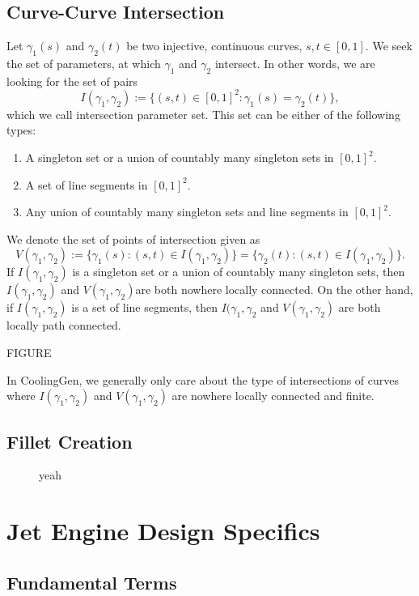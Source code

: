 \documentclass[a4paper, 11pt]{report}
\theoremstyle{definition}
\begin{document}
\subsection{Curve-Curve Intersection}
	Let $\gamma_1(s)$ and $\gamma_2(t)$ be two injective, continuous curves, $s,t \in [0,1]$. We seek the set of parameters, at which $\gamma_1$ and $\gamma_2$ intersect. In other words, we are looking for the set of pairs
		$$ I(\gamma_1, \gamma_2) := \{(s,t) \in [0,1]^2 : \gamma_1(s) = \gamma_2(t)\}, $$
	which we call intersection parameter set. This set can be either of the following types:
	\begin{enumerate}
		\item A singleton set or a union of countably many singleton sets in $[0,1]^2$.
		\item A set of line segments in $[0,1]^2$.
		\item Any union of countably many singleton sets and line segments in $[0,1]^2$.
	\end{enumerate}
	We denote the set of points of intersection given as
		$$ V(\gamma_1, \gamma_2) := \{\gamma_1(s): (s, t) \in I(\gamma_1, \gamma_2)\} = \{\gamma_2(t): (s, t) \in I(\gamma_1, \gamma_2)\}.$$
	If $I(\gamma_1, \gamma_2)$ is a singleton set or a union of countably many singleton sets, then $I(\gamma_1, \gamma_2)$ and $V(\gamma_1, \gamma_2)$are both nowhere locally connected. On the other hand, if $I(\gamma_1, \gamma_2)$ is a set of line segments, then $I(\gamma_1, \gamma_2$ and $V(\gamma_1, \gamma_2)$ are both locally path connected.

	FIGURE

	In CoolingGen, we generally only care about the type of intersections of curves where $I(\gamma_1, \gamma_2)$ and $V(\gamma_1, \gamma_2)$ are nowhere locally connected and finite.

\subsection{Fillet Creation}
\begin{figure}[H]
	\centering
	
	\caption{yeah}
\end{figure}


\section{Jet Engine Design Specifics}
\subsection{Fundamental Terms}
\end{document}
